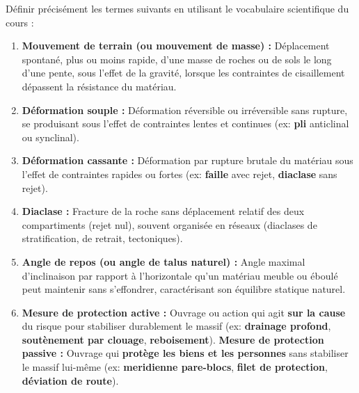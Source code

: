 \documentclass[11pt]{article}
\begin{document}
\begin{exercice}
Définir précisément les termes suivants en utilisant le vocabulaire scientifique du cours :
\begin{enumerate}
\item \textbf{Mouvement de terrain (ou mouvement de masse) :} Déplacement spontané, plus ou moins rapide, d'une masse de roches ou de sols le long d'une pente, sous l'effet de la gravité, lorsque les contraintes de cisaillement dépassent la résistance du matériau.
\item \textbf{Déformation souple :} Déformation réversible ou irréversible sans rupture, se produisant sous l'effet de contraintes lentes et continues (ex: \textbf{pli} anticlinal ou synclinal).
\item \textbf{Déformation cassante :} Déformation par rupture brutale du matériau sous l'effet de contraintes rapides ou fortes (ex: \textbf{faille} avec rejet, \textbf{diaclase} sans rejet).
\item \textbf{Diaclase :} Fracture de la roche sans déplacement relatif des deux compartiments (rejet nul), souvent organisée en réseaux (diaclases de stratification, de retrait, tectoniques).
\item \textbf{Angle de repos (ou angle de talus naturel) :} Angle maximal d'inclinaison par rapport à l'horizontale qu'un matériau meuble ou éboulé peut maintenir sans s'effondrer, caractérisant son équilibre statique naturel.
\item \textbf{Mesure de protection active :} Ouvrage ou action qui agit \textbf{sur la cause} du risque pour stabiliser durablement le massif (ex: \textbf{drainage profond}, \textbf{soutènement par clouage}, \textbf{reboisement}). \textbf{Mesure de protection passive :} Ouvrage qui \textbf{protège les biens et les personnes} sans stabiliser le massif lui-même (ex: \textbf{meridienne pare-blocs}, \textbf{filet de protection}, \textbf{déviation de route}).
\end{enumerate}
\end{exercice}
\end{document}
